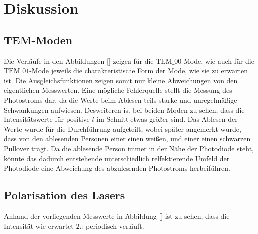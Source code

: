 \section{Diskussion}
\label{sec:Diskussion}

\subsection{TEM-Moden}

Die Verläufe in den Abbildungen [] zeigen für die $\text{TEM_{00}}$-Mode, wie auch für die $\text{TEM_{01}}$-Mode jeweils
die charakteristische Form der Mode, wie sie zu erwarten ist. Die Ausgleichsfunktionen zeigen somit nur kleine Abweichungen von den 
eigentlichen Messwerten. Eine mögliche Fehlerquelle stellt die Messung des Photostroms dar, da die Werte beim Ablesen teils starke und 
unregelmäßige Schwankungen aufwiesen. Desweiteren ist bei beiden Moden zu sehen, dass die Intensitätswerte für positive $l$ im Schnitt etwas 
größer sind. Das Ablesen der Werte wurde für die Durchführung aufgeteilt, wobei später angemerkt wurde, dass von den ablesenden Personen 
einer einen weißen, und einer einen schwarzen Pullover trägt. Da die ablesende Person immer in der Nähe der Photodiode steht, könnte das dadurch
entstehende unterschiedlich relfektierende Umfeld der Photodiode eine Abweichung des abzulesenden Photostroms herbeiführen. 

\subsection{Polarisation des Lasers}

Anhand der vorliegenden Messwerte in Abbildung [] ist zu sehen, dass die Intensität wie erwartet $2\pi$-periodisch verläuft. 
